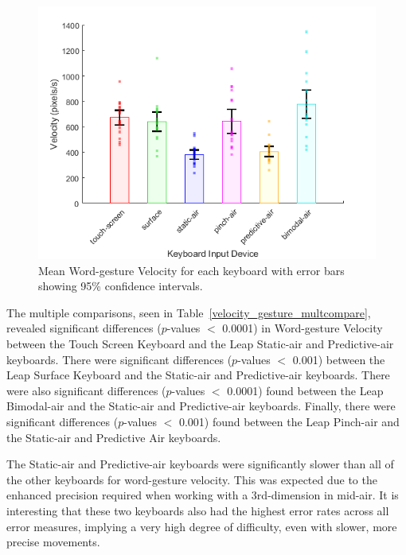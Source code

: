\begin{figure}[h]
	\centering
	\includegraphics{Figures/fig_velocity_gesture_mean}
	\caption[Mean Word-gesture Velocity]{Mean Word-gesture Velocity for each keyboard with error bars showing 95\% confidence intervals.}
	\label{fig_velocity_gesture_mean}
\end{figure}

The multiple comparisons, seen in Table~\ref{velocity_gesture_multcompare}, revealed significant differences ($p$-values $<$ 0.0001) in Word-gesture Velocity between the Touch Screen Keyboard and the Leap Static-air and Predictive-air keyboards. There were significant differences ($p$-values $<$ 0.001) between the Leap Surface Keyboard and the Static-air and Predictive-air keyboards. There were also significant differences ($p$-values $<$ 0.0001) found between the Leap Bimodal-air and the Static-air and Predictive-air keyboards. Finally, there were significant differences ($p$-values $<$ 0.001) found between the Leap Pinch-air and the Static-air and Predictive Air keyboards.

The Static-air and Predictive-air keyboards were significantly slower than all of the other keyboards for word-gesture velocity. This was expected due to the enhanced precision required when working with a 3rd-dimension in mid-air. It is interesting that these two keyboards also had the highest error rates across all error measures, implying a very high degree of difficulty, even with slower, more precise movements.

